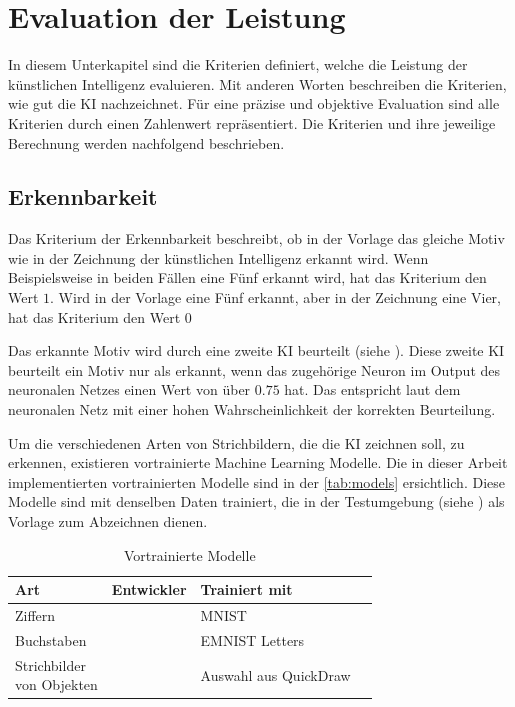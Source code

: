  
 
\section{Evaluation der Leistung}\label{chap:m_eval}
In diesem Unterkapitel sind die Kriterien definiert, welche die Leistung der
künstlichen Intelligenz evaluieren. Mit anderen Worten beschreiben die
Kriterien, wie gut die KI nachzeichnet. Für eine präzise und objektive
Evaluation sind alle Kriterien durch einen Zahlenwert repräsentiert. Die
Kriterien und ihre jeweilige Berechnung werden nachfolgend beschrieben.
 
\subsection{Erkennbarkeit}\label{sub:m_eval_rec}
Das Kriterium der Erkennbarkeit beschreibt, ob in der Vorlage das gleiche Motiv
wie in der Zeichnung der künstlichen Intelligenz erkannt wird. Wenn
Beispielsweise in beiden Fällen eine Fünf erkannt wird, hat das Kriterium den
Wert $1$. Wird in der Vorlage eine Fünf erkannt, aber in der Zeichnung eine
Vier, hat das Kriterium den Wert $0$
 
Das erkannte Motiv wird durch eine zweite KI beurteilt (siehe
). Diese zweite KI beurteilt ein Motiv nur als erkannt,
wenn das zugehörige Neuron im Output des neuronalen Netzes einen Wert von über
$0.75$ hat. Das entspricht laut dem neuronalen Netz mit einer hohen
Wahrscheinlichkeit der korrekten Beurteilung.
 
Um die verschiedenen Arten von Strichbildern, die die KI zeichnen soll, zu
erkennen, existieren vortrainierte Machine Learning Modelle. Die in dieser
Arbeit implementierten vortrainierten Modelle sind in der \autoref{tab:models}
ersichtlich. Diese Modelle sind mit denselben Daten trainiert, die in der
Testumgebung (siehe ) als Vorlage zum Abzeichnen
dienen.
 
\begin{table}[!ht]
 \centering
 \begin{tabular}{|l|l|l|l|}
 \hline
     Art & Entwickler & Trainiert mit \\ \hline
     Ziffern & \cite{mazzia__2022} & MNIST \\ \hline
     Buchstaben & \cite{mor_emnist_2022} & EMNIST Letters \\ \hline
     \makecell{Strichbilder\\von Objekten} & \cite{lam_linus_keras_2022} & Auswahl aus QuickDraw \\ \hline
 \end{tabular}
 \caption{Vortrainierte Modelle}\label{tab:models}
\end{table}
 

